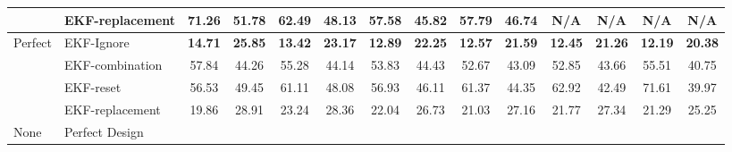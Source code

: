 \documentclass[letterpaper, 10 pt, conference]{ieeeconf}  %
\begin{document}
\begin{table*}[]
\begin{tabular}{@{}llcccccccccccc@{}}
	\multicolumn{1}{|l|}{} &
	\multicolumn{1}{l|}{EKF-replacement} &
	\multicolumn{1}{l|}{71.26} &
	\multicolumn{1}{l|}{51.78} &
	\multicolumn{1}{l|}{62.49} &
	\multicolumn{1}{l|}{48.13} &
	\multicolumn{1}{l|}{57.58} &
	\multicolumn{1}{l|}{45.82} &
	\multicolumn{1}{l|}{57.79} &
	\multicolumn{1}{l|}{46.74} &
	\multicolumn{1}{c|}{N/A} &
	\multicolumn{1}{c|}{N/A} &
	\multicolumn{1}{c|}{N/A} &
	\multicolumn{1}{c|}{N/A} \\ \midrule
	\multicolumn{1}{|l|}{\multirow{4}{*}{Perfect}} &
	\multicolumn{1}{l|}{EKF-Ignore} &
	\multicolumn{1}{c|}{\textbf{14.71}} &
	\multicolumn{1}{c|}{\textbf{25.85}} &
	\multicolumn{1}{c|}{\textbf{13.42}} &
	\multicolumn{1}{c|}{\textbf{23.17}} &
	\multicolumn{1}{c|}{\textbf{12.89}} &
	\multicolumn{1}{c|}{\textbf{22.25}} &
	\multicolumn{1}{c|}{\textbf{12.57}} &
	\multicolumn{1}{c|}{\textbf{21.59}} &
	\multicolumn{1}{c|}{\textbf{12.45}} &
	\multicolumn{1}{c|}{\textbf{21.26}} &
	\multicolumn{1}{c|}{\textbf{12.19}} &
	\multicolumn{1}{c|}{\textbf{20.38}} \\ \cmidrule(l){2-14} 
	\multicolumn{1}{|l|}{} &
	\multicolumn{1}{l|}{EKF-combination} &
	\multicolumn{1}{c|}{57.84} &
	\multicolumn{1}{c|}{44.26} &
	\multicolumn{1}{c|}{55.28} &
	\multicolumn{1}{c|}{44.14} &
	\multicolumn{1}{c|}{53.83} &
	\multicolumn{1}{c|}{44.43} &
	\multicolumn{1}{c|}{52.67} &
	\multicolumn{1}{c|}{43.09} &
	\multicolumn{1}{c|}{52.85} &
	\multicolumn{1}{c|}{43.66} &
	\multicolumn{1}{c|}{55.51} &
	\multicolumn{1}{c|}{40.75} \\ \cmidrule(l){2-14} 
	\multicolumn{1}{|l|}{} &
	\multicolumn{1}{l|}{EKF-reset} &
	\multicolumn{1}{c|}{56.53} &
	\multicolumn{1}{c|}{49.45} &
	\multicolumn{1}{c|}{61.11} &
	\multicolumn{1}{c|}{48.08} &
	\multicolumn{1}{c|}{56.93} &
	\multicolumn{1}{c|}{46.11} &
	\multicolumn{1}{c|}{61.37} &
	\multicolumn{1}{c|}{44.35} &
	\multicolumn{1}{c|}{62.92} &
	\multicolumn{1}{c|}{42.49} &
	\multicolumn{1}{c|}{71.61} &
	\multicolumn{1}{c|}{39.97} \\ \cmidrule(l){2-14} 
	\multicolumn{1}{|l|}{} &
	\multicolumn{1}{l|}{EKF-replacement} &
	\multicolumn{1}{c|}{19.86} &
	\multicolumn{1}{c|}{28.91} &
	\multicolumn{1}{c|}{23.24} &
	\multicolumn{1}{c|}{28.36} &
	\multicolumn{1}{c|}{22.04} &
	\multicolumn{1}{c|}{26.73} &
	\multicolumn{1}{c|}{21.03} &
	\multicolumn{1}{c|}{27.16} &
	\multicolumn{1}{c|}{21.77} &
	\multicolumn{1}{c|}{27.34} &
	\multicolumn{1}{c|}{21.29} &
	\multicolumn{1}{c|}{25.25} \\ \midrule
	\multicolumn{1}{|l|}{\multirow{2}{*}{None}} &
	\multicolumn{1}{l|}{Perfect Design} &

\end{tabular}
\end{table*}
\end{document}
